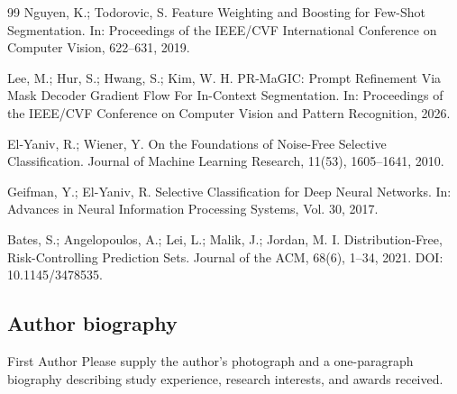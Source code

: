 \documentclass{CVM}
\begin{document}
\begin{thebibliography}{99}
 Nguyen, K.; Todorovic, S. Feature Weighting and Boosting for Few-Shot Segmentation. In: Proceedings of the IEEE/CVF International Conference on Computer Vision, 622--631, 2019.

 Lee, M.; Hur, S.; Hwang, S.; Kim, W. H. PR-MaGIC: Prompt Refinement Via Mask Decoder Gradient Flow For In-Context Segmentation. In: Proceedings of the IEEE/CVF Conference on Computer Vision and Pattern Recognition, 2026.

 El-Yaniv, R.; Wiener, Y. On the Foundations of Noise-Free Selective Classification. Journal of Machine Learning Research, 11(53), 1605--1641, 2010.

 Geifman, Y.; El-Yaniv, R. Selective Classification for Deep Neural Networks. In: Advances in Neural Information Processing Systems, Vol. 30, 2017.

 Bates, S.; Angelopoulos, A.; Lei, L.; Malik, J.; Jordan, M. I. Distribution-Free, Risk-Controlling Prediction Sets. Journal of the ACM, 68(6), 1--34, 2021. DOI: 10.1145/3478535.

\end{thebibliography}

% 
% 

\subsection*{Author biography}

\begin{biography}[author1]{First Author} Please supply the author's photograph and a one-paragraph biography describing study experience, research interests, and awards received.\end{biography}
\end{document}

